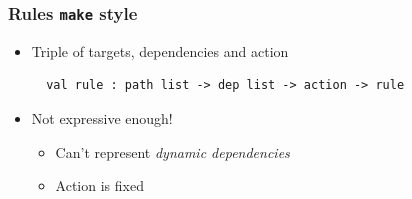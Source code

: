 \documentclass{beamer}
\begin{document}
%
%




\begin{frame}[fragile]
\frametitle{Rules {\tt make} style}
\begin{itemize}
\item Triple of targets, dependencies and action
{\footnotesize
\begin{verbatim}
  val rule : path list -> dep list -> action -> rule

\end{verbatim}}
\item Not expressive enough!
\begin{itemize}
\item Can't represent {\em dynamic dependencies}
\item Action is fixed
\end{itemize}
\end{itemize}
\end{frame}

\end{document}
